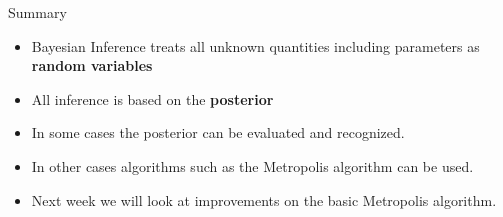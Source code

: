 \documentclass[10pt]{beamer}
\begin{document}
\begin{frame}{Summary}
  \begin{itemize}
  \item Bayesian Inference treats all unknown quantities including parameters as {\bf random variables}

  \item All inference is based on the {\bf posterior}

  \item In some cases the posterior can be evaluated and recognized.

  \item In other cases algorithms such as the Metropolis algorithm can be used.

  \item Next week we will look at improvements on the basic Metropolis algorithm.
  \end{itemize}
\end{frame}
\end{document}
